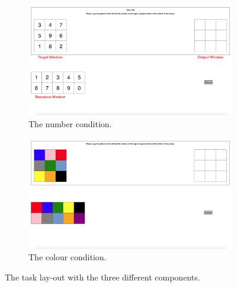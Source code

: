 \begin{figure}[]
\begin{center}

\begin{subfigure}[b]{\textwidth}
\centerline{\includegraphics[scale=0.23]{images/ch34/ch4_numbers.png}}
\caption{The number condition.}
\label{fig:ch4_BWT}
\end{subfigure}
\begin{subfigure}[b]{0.5\textwidth}
\centerline{\includegraphics[scale=0.23]{images/ch34/ch4_colours.png}}
\caption{The colour condition.}
\label{fig:ch4_NWT}
\end{subfigure}
\caption[Study 3 task lay-out]{The task lay-out with the three different components.}
\label{fig:ch4_taskparadigm}
\end{center}
\end{figure}

